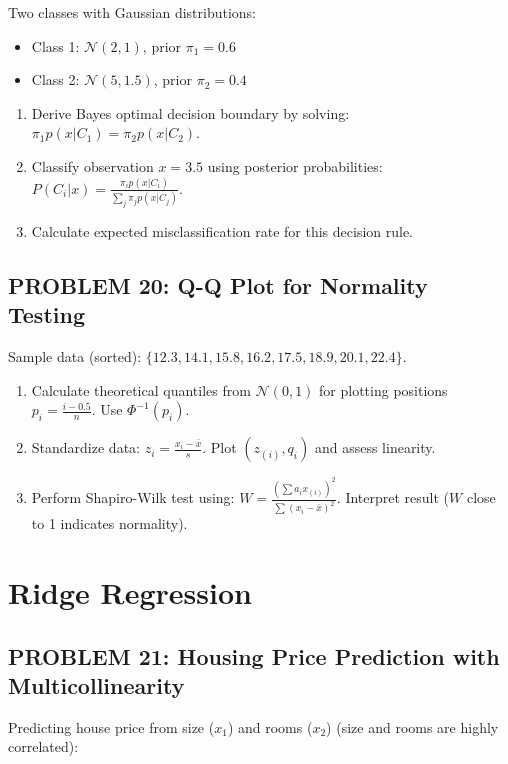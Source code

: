\documentclass[12pt]{article}
\begin{document}
Two classes with Gaussian distributions:
\begin{itemize}
\item Class 1: \(\mathcal{N}(2, 1)\), prior \(\pi_1 = 0.6\)
\item Class 2: \(\mathcal{N}(5, 1.5)\), prior \(\pi_2 = 0.4\)
\end{itemize}

\begin{enumerate}
\item[(a)] Derive Bayes optimal decision boundary by solving: \(\pi_1 p(x|C_1) = \pi_2 p(x|C_2)\).
\item[(b)] Classify observation \(x = 3.5\) using posterior probabilities: \(P(C_i|x) = \frac{\pi_i p(x|C_i)}{\sum_j \pi_j p(x|C_j)}\).
\item[(c)] Calculate expected misclassification rate for this decision rule.
\end{enumerate}

\subsection*{PROBLEM 20: Q-Q Plot for Normality Testing}

Sample data (sorted): \(\{12.3, 14.1, 15.8, 16.2, 17.5, 18.9, 20.1, 22.4\}\).

\begin{enumerate}
\item[(a)] Calculate theoretical quantiles from \(\mathcal{N}(0,1)\) for plotting positions \(p_i = \frac{i-0.5}{n}\). Use \(\Phi^{-1}(p_i)\).
\item[(b)] Standardize data: \(z_i = \frac{x_i - \bar{x}}{s}\). Plot \((z_{(i)}, q_i)\) and assess linearity.
\item[(c)] Perform Shapiro-Wilk test using: \(W = \frac{(\sum a_i x_{(i)})^2}{\sum(x_i - \bar{x})^2}\). Interpret result (\(W\) close to 1 indicates normality).
\end{enumerate}

\newpage
\section*{Ridge Regression}

\subsection*{PROBLEM 21: Housing Price Prediction with Multicollinearity}

Predicting house price from size (\(x_1\)) and rooms (\(x_2\)) (size and rooms are highly correlated):
\end{document}
